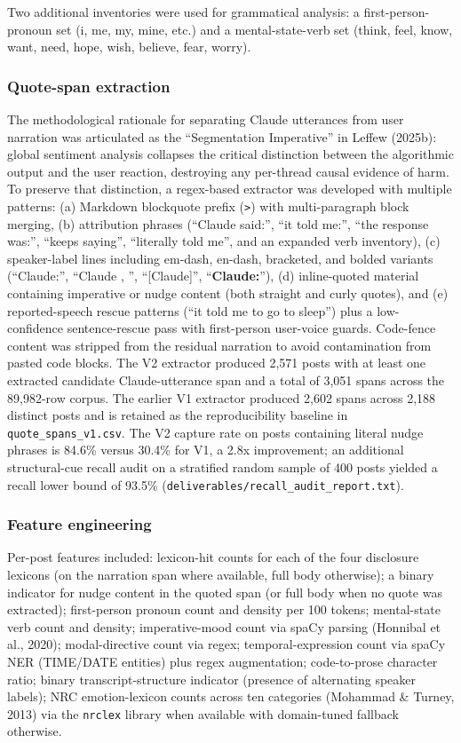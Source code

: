 \documentclass[11pt]{article}
\begin{document}
Two additional inventories were used for grammatical analysis: a first-person-pronoun set (i, me, my, mine, etc.) and a mental-state-verb set (think, feel, know, want, need, hope, wish, believe, fear, worry).

\subsubsection{Quote-span extraction}

The methodological rationale for separating Claude utterances from user narration was articulated as the ``Segmentation Imperative'' in Leffew (2025b): global sentiment analysis collapses the critical distinction between the algorithmic output and the user reaction, destroying any per-thread causal evidence of harm. To preserve that distinction, a regex-based extractor was developed with multiple patterns: (a) Markdown blockquote prefix (\texttt{>}) with multi-paragraph block merging, (b) attribution phrases (``Claude said:'', ``it told me:'', ``the response was:'', ``keeps saying'', ``literally told me'', and an expanded verb inventory), (c) speaker-label lines including em-dash, en-dash, bracketed, and bolded variants (``Claude:'', ``Claude , '', ``[Claude]'', ``\textbf{Claude:}''), (d) inline-quoted material containing imperative or nudge content (both straight and curly quotes), and (e) reported-speech rescue patterns (``it told me to go to sleep'') plus a low-confidence sentence-rescue pass with first-person user-voice guards. Code-fence content was stripped from the residual narration to avoid contamination from pasted code blocks. The V2 extractor produced 2,571 posts with at least one extracted candidate Claude-utterance span and a total of 3,051 spans across the 89,982-row corpus. The earlier V1 extractor produced 2,602 spans across 2,188 distinct posts and is retained as the reproducibility baseline in \texttt{quote\_spans\_v1.csv}. The V2 capture rate on posts containing literal nudge phrases is 84.6\% versus 30.4\% for V1, a 2.8x improvement; an additional structural-cue recall audit on a stratified random sample of 400 posts yielded a recall lower bound of 93.5\% (\texttt{deliverables/recall\_audit\_report.txt}).

\subsubsection{Feature engineering}

Per-post features included: lexicon-hit counts for each of the four disclosure lexicons (on the narration span where available, full body otherwise); a binary indicator for nudge content in the quoted span (or full body when no quote was extracted); first-person pronoun count and density per 100 tokens; mental-state verb count and density; imperative-mood count via spaCy parsing (Honnibal et al., 2020); modal-directive count via regex; temporal-expression count via spaCy NER (TIME/DATE entities) plus regex augmentation; code-to-prose character ratio; binary transcript-structure indicator (presence of alternating speaker labels); NRC emotion-lexicon counts across ten categories (Mohammad \& Turney, 2013) via the \texttt{nrclex} library when available with domain-tuned fallback otherwise.
\end{document}

